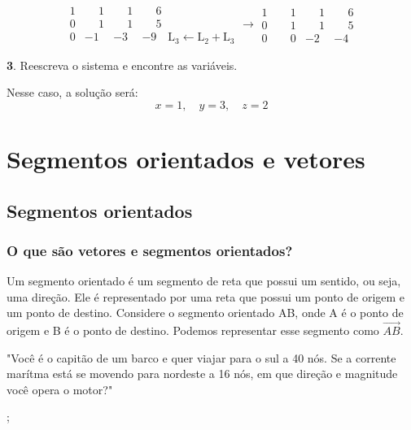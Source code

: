 \documentclass[12pt]{article}
\begin{document}
\[
    \begin{array}{rrr|l}
        1  &  \phantom{-}1  &  \phantom{-}1  &  \phantom{-}6 \\
        0  &  \phantom{-}1  &  \phantom{-}1  &  \phantom{-}5 \\
        0  &            -1  &            -3  &            -9 \quad \text{L}_3 \leftarrow \text{L}_2 + \text{L}_3
    \end{array}
\rightarrow
\begin{array}{rrr|l}
    1  &  \phantom{-}1  &  \phantom{-}1  &  \phantom{-}6 \\
    0  &  \phantom{-}1  &  \phantom{-}1  &  \phantom{-}5 \\
    0  &  \phantom{-}0  &            -2  &            -4
\end{array}
\]

\textbf{3}. Reescreva o sistema e encontre as variáveis.

Nesse caso, a solução será:
\[
x = 1, \quad y = 3, \quad z = 2
\]

\pagebreak
\section{Segmentos orientados e vetores}
\subsection{Segmentos orientados}
\subsubsection{O que são vetores e segmentos orientados?}
Um segmento orientado é um segmento de reta que possui um sentido, ou seja, uma direção.
Ele é representado por uma reta que possui um ponto de origem e um ponto de destino.
Considere o segmento orientado AB, onde A é o ponto de origem e B é o ponto de destino. Podemos representar esse segmento como $\overrightarrow{AB}$.

\noindent
"Você é o capitão de um barco e quer viajar para o sul a 40 nós. Se a corrente marítma está se movendo para nordeste a 16 nós,
em que direção e magnitude você opera o motor?"

;
\end{document}
